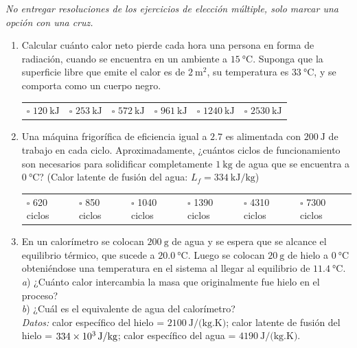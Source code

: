 \documentclass[a4paper,11pt,dvipsnames]{article}
\begin{document}


\textit{No entregar resoluciones de los ejercicios de elección múltiple, solo marcar una opción con una cruz.}

\begin{enumerate}[leftmargin=*]
  \item Calcular cuánto calor neto pierde cada hora una persona en forma de radiación, cuando se encuentra en un ambiente a $\SI{15}{\celsius}$. Suponga que la superficie libre que emite el calor es de $\SI{2}{\metre\squared}$, su temperatura es $\SI{33}{\celsius}$, y se comporta como un cuerpo negro.\\
  \begin{tabularx}{\textwidth}{XXXXXX}
    $\square$ $\SI{120}{\kilo\joule}$ & $\square$ $\SI{253}{\kilo\joule}$ & $\square$ $\SI{572}{\kilo\joule}$ & $\square$ $\SI{961}{\kilo\joule}$ & $\square$ $\SI{1240}{\kilo\joule}$ & $\square$ $\SI{2530}{\kilo\joule}$\\
  \end{tabularx}
  
  \item Una máquina frigorífica de eficiencia igual a $2.7$ es alimentada con $\SI{200}{\joule}$ de trabajo en cada ciclo. Aproximadamente, ¿cuántos ciclos de funcionamiento son necesarios para solidificar completamente $\SI{1}{\kilo\gram}$ de agua que se encuentra a $\SI{0}{\celsius}$? (Calor latente de fusión del agua: $L_f = \SI{334}{\kilo\joule/\kilogram}$)\\
  \begin{tabularx}{\textwidth}{XXXXXX}
    $\square$ 620 ciclos & $\square$ 850 ciclos & $\square$ 1040 ciclos & $\square$ 1390 ciclos & $\square$ 4310 ciclos & $\square$ 7300 ciclos\\
  \end{tabularx}
  
  
  \item En un calorímetro se colocan $\SI{200}{\gram}$ de agua y se espera que se alcance el equilibrio térmico, que sucede a $\SI{20.0}{\celsius}$. Luego se colocan $\SI{20}{\gram}$ de hielo a $\SI{0}{\celsius}$ obteniéndose una temperatura en el sistema al llegar al equilibrio de $\SI{11.4}{\celsius}$.\\
  \textit{a}) ¿Cuánto calor intercambia la masa que originalmente fue hielo en el proceso?\\
  \textit{b}) ¿Cuál es el equivalente de agua del calorímetro?\\
  \textit{Datos:} calor específico del hielo = $\SI{2100}{\joule/(\kilogram . \kelvin)}$; calor latente de fusión del hielo = $\SI{334E3}{\joule/\kilogram}$; calor específico del agua = $\SI{4190}{\joule/(\kilogram . \kelvin)}$.
   


\end{enumerate}
\end{document}

